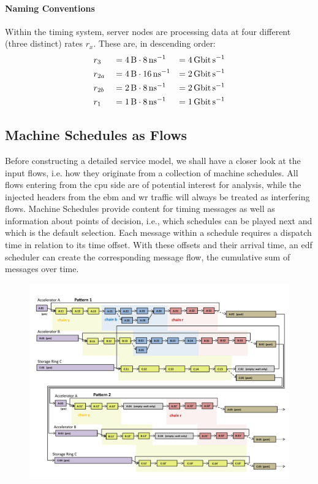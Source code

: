 \paragraph{Naming Conventions} 
Within the timing system, server nodes are processing data at four different (three distinct) rates $r_x$. These are, in descending order:
\begin{equation}
\begin{aligned}
\notag
&r_3 &&= \SI{4}{\byte} \cdot \SI{8}{\per\nano\second} &= \SI{4}{\giga\bit\per\second}\\
&r_{2a} &&= \SI{4}{\byte} \cdot  \SI{16}{\per\nano\second} &= \SI{2}{\giga\bit\per\second}\\
&r_{2b} &&= \SI{2}{\byte} \cdot  \SI{8}{\per\nano\second}  &= \SI{2}{\giga\bit\per\second}\\ 
&r_1 &&= \SI{1}{\byte} \cdot \SI{8}{\per\nano\second} &= \SI{1}{\giga\bit\per\second}
\label{eq:rates}
\end{aligned}
\end{equation}
%


\subsection{Machine Schedules as Flows}
\label{ssec:machine-flows}
Before constructing a detailed service model, we shall have a closer look at the input flows, i.e. how they originate from a collection of
machine schedules. All flows entering from the \gls{cpu} side are of potential interest for analysis, while the injected headers from the \gls{ebm} and \gls{wr} traffic will always be treated as interfering flows. 
Machine Schedules provide content for timing messages as well as information about points of decision, i.e., which schedules can be played next and which is the default selection.
Each message within a schedule requires a dispatch time in relation to its time offset. With these offsets and their arrival time, an \gls{edf} scheduler can create the corresponding message flow,
the cumulative sum of messages over time.
%
\begin{figure}[H]
  \centering
  \includegraphics*[width=\textwidth,height=\textheight,keepaspectratio]{Figures/SchedExec}
\end{figure}
%
